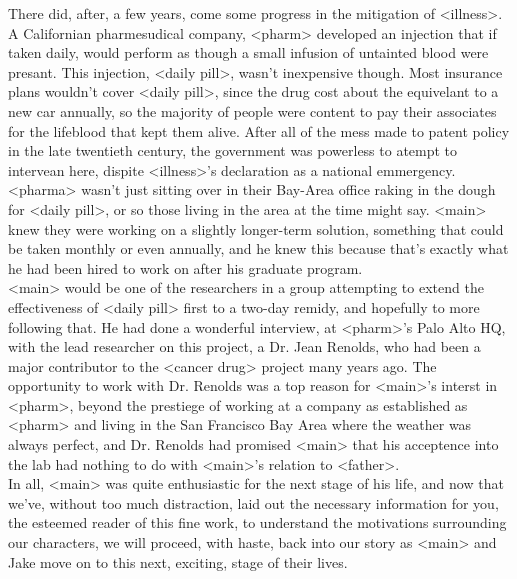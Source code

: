 \documentclass[12pt,openany]{memoir}
\begin{document}
There did, after, a few years, come some progress in the mitigation of <illness>.
A Californian pharmesudical company, <pharm> developed an injection that if taken daily, would perform as though a small infusion of untainted blood were presant.
This injection, <daily pill>, wasn't inexpensive though.
Most insurance plans wouldn't cover <daily pill>, since the drug cost about the equivelant to a new car annually, so the majority of people were content to pay their associates for the lifeblood that kept them alive.
After all of the mess made to patent policy in the late twentieth century, the government was powerless to atempt to intervean here, dispite <illness>'s declaration as a national emmergency.
\\

<pharma> wasn't just sitting over in their Bay-Area office raking in the dough for <daily pill>, or so those living in the area at the time might say.
<main> knew they were working on a slightly longer-term solution, something that could be taken monthly or even annually, and he knew this because that's exactly what he had been hired to work on after his graduate program.
\\

<main> would be one of the researchers in a group attempting to extend the effectiveness of <daily pill> first to a two-day remidy, and hopefully to more following that.
He had done a wonderful interview, at <pharm>'s Palo Alto HQ, with the lead researcher on this project, a Dr. Jean Renolds, who had been a major contributor to the <cancer drug> project many years ago.
The opportunity to work with Dr. Renolds was a top reason for <main>'s interst in <pharm>, beyond the prestiege of working at a company as established as <pharm> and living in the San Francisco Bay Area where the weather was always perfect, and Dr. Renolds had promised <main> that his acceptence into the lab had nothing to do with <main>'s relation to <father>.
\\

In all, <main> was quite enthusiastic for the next stage of his life, and now that we've, without too much distraction, laid out the necessary information for you, the esteemed reader of this fine work, to understand the motivations surrounding our characters, we will proceed, with haste, back into our story as <main> and Jake move on to this next, exciting, stage of their lives.
\\
\end{document}
